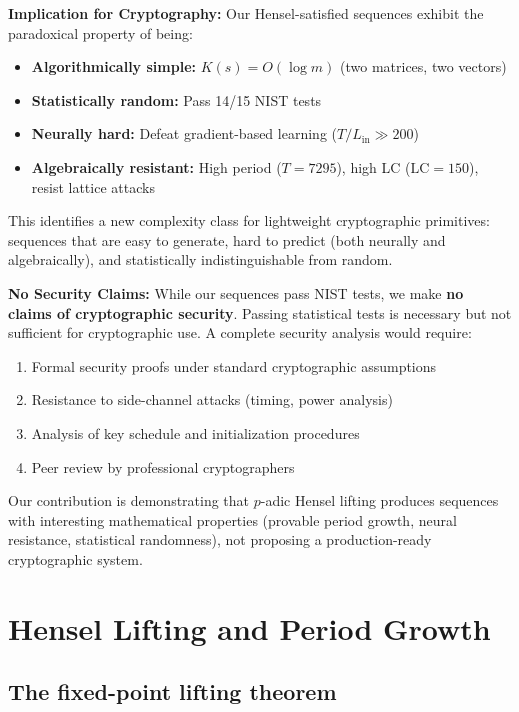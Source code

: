 \documentclass[11pt]{article}
\theoremstyle{plain}
\theoremstyle{definition}
\newcommand{\LC}{\mathrm{LC}}
\begin{document}
\textbf{Implication for Cryptography:} Our Hensel-satisfied sequences exhibit the paradoxical property of being:
\begin{itemize}[leftmargin=2em]
\item \textbf{Algorithmically simple:} $K(s) = O(\log m)$ (two matrices, two vectors)
\item \textbf{Statistically random:} Pass 14/15 NIST tests
\item \textbf{Neurally hard:} Defeat gradient-based learning ($T/L_{\mathrm{in}} \gg 200$)
\item \textbf{Algebraically resistant:} High period ($T=7295$), high LC ($\LC=150$), resist lattice attacks
\end{itemize}

This identifies a new complexity class for lightweight cryptographic primitives: sequences that are easy to generate, hard to predict (both neurally and algebraically), and statistically indistinguishable from random.

\textbf{No Security Claims:} While our sequences pass NIST tests, we make \textbf{no claims of cryptographic security}. Passing statistical tests is necessary but not sufficient for cryptographic use. A complete security analysis would require:
\begin{enumerate}[leftmargin=2em]
\item Formal security proofs under standard cryptographic assumptions
\item Resistance to side-channel attacks (timing, power analysis)
\item Analysis of key schedule and initialization procedures
\item Peer review by professional cryptographers
\end{enumerate}

Our contribution is demonstrating that $p$-adic Hensel lifting produces sequences with interesting mathematical properties (provable period growth, neural resistance, statistical randomness), not proposing a production-ready cryptographic system.

\section{Hensel Lifting and Period Growth}
\label{sec:hensel}

\subsection{The fixed-point lifting theorem}
\end{document}
